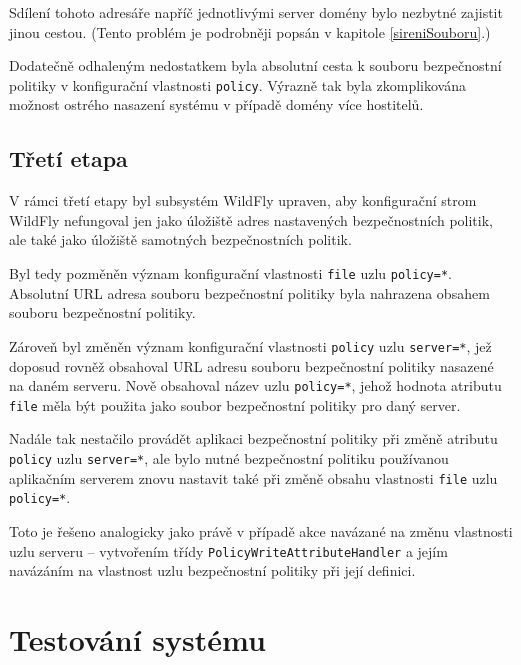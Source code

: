 Sdílení tohoto adresáře napříč jednotlivými server domény bylo nezbytné zajistit jinou cestou. (Tento problém je podrobněji popsán v kapitole \ref{sireniSouboru}.)

Dodatečně odhaleným nedostatkem byla absolutní cesta k souboru bezpečnostní politiky v konfigurační vlastnosti {\tt policy}.
Výrazně tak byla zkomplikována možnost ostrého nasazení systému v případě domény více hostitelů.

\section{Třetí etapa}

V rámci třetí etapy byl subsystém WildFly upraven, aby konfigurační strom WildFly nefungoval jen jako úložiště adres nastavených bezpečnostních politik, ale také jako úložiště samotných bezpečnostních politik.

Byl tedy pozměněn význam konfigurační vlastnosti {\tt file} uzlu {\tt policy=*}. Absolutní URL adresa souboru bezpečnostní politiky byla nahrazena obsahem souboru bezpečnostní politiky.

Zároveň byl změněn význam konfigurační vlastnosti {\tt policy} uzlu {\tt server=*}, jež doposud rovněž obsahoval URL adresu souboru bezpečnostní politiky nasazené na daném serveru.
Nově obsahoval název uzlu {\tt policy=*}, jehož hodnota atributu {\tt file} měla být použita jako soubor bezpečnostní politiky pro daný server.

Nadále tak nestačilo provádět aplikaci bezpečnostní politiky při změně atributu {\tt policy} uzlu {\tt server=*}, ale bylo nutné bezpečnostní politiku používanou aplikačním serverem znovu nastavit také při změně obsahu vlastnosti {\tt file} uzlu {\tt policy=*}.

Toto je řešeno analogicky jako právě v případě akce navázané na změnu vlastnosti uzlu serveru -- vytvořením třídy {\tt PolicyWriteAttributeHandler} a jejím navázáním na vlastnost uzlu bezpečnostní politiky při její definici.

\chapter{Testování systému} \label{testovani}

